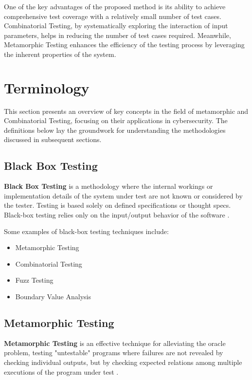 One of the key advantages of the proposed method is its ability to achieve comprehensive test coverage with a relatively small number of test cases. Combinatorial Testing, by systematically exploring the interaction of input parameters, helps in reducing the number of test cases required. Meanwhile, Metamorphic Testing enhances the efficiency of the testing process by leveraging the inherent properties of the system.

\section{Terminology}

This section presents an overview of key concepts in the field of metamorphic and Combinatorial Testing, focusing on their applications in cybersecurity. The definitions below lay the groundwork for understanding the methodologies discussed in subsequent sections.

\subsection{Black Box Testing}

\textbf{Black Box Testing} is a methodology where the internal workings or implementation details of the system under test are not known or considered by the tester. Testing is based solely on defined specifications or thought specs. Black-box testing relies only on the input/output behavior of the software \cite{Testing}.

Some examples of black-box testing techniques include:
\begin{itemize}
    \item Metamorphic Testing
    \item Combinatorial Testing
    \item Fuzz Testing
    \item Boundary Value Analysis
\end{itemize}

\subsection{Metamorphic Testing}

\textbf{Metamorphic Testing} is an effective technique for alleviating the oracle problem, testing "untestable" programs where failures are not revealed by checking individual outputs, but by checking expected relations among multiple executions of the program under test \cite{CybersecurityMT}.

